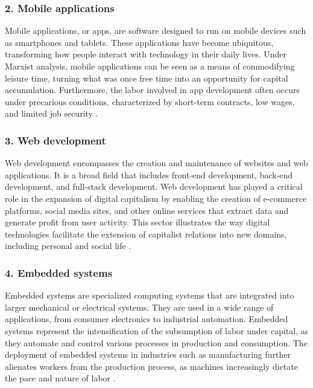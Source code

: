 \begin{refsection}
\begin{multicols}{2}
{\subsubsection*{2. Mobile applications}
Mobile applications, or apps, are software designed to run on mobile devices such as smartphones and tablets. These applications have become ubiquitous, transforming how people interact with technology in their daily lives. Under Marxist analysis, mobile applications can be seen as a means of commodifying leisure time, turning what was once free time into an opportunity for capital accumulation. Furthermore, the labor involved in app development often occurs under precarious conditions, characterized by short-term contracts, low wages, and limited job security \cite{fuchs2014digital}.

\subsubsection*{3. Web development}
Web development encompasses the creation and maintenance of websites and web applications. It is a broad field that includes front-end development, back-end development, and full-stack development. Web development has played a critical role in the expansion of digital capitalism by enabling the creation of e-commerce platforms, social media sites, and other online services that extract data and generate profit from user activity. This sector illustrates the way digital technologies facilitate the extension of capitalist relations into new domains, including personal and social life \cite{schiller2000digital}.

\subsubsection*{4. Embedded systems}
Embedded systems are specialized computing systems that are integrated into larger mechanical or electrical systems. They are used in a wide range of applications, from consumer electronics to industrial automation. Embedded systems represent the intensification of the subsumption of labor under capital, as they automate and control various processes in production and consumption. The deployment of embedded systems in industries such as manufacturing further alienates workers from the production process, as machines increasingly dictate the pace and nature of labor \cite{marx1867capital}.

}
\end{multicols}
\end{refsection}
